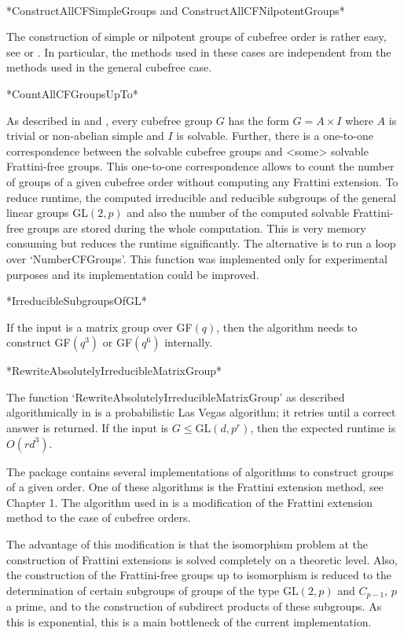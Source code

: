 ~

*ConstructAllCFSimpleGroups and ConstructAllCFNilpotentGroups*

The construction of simple or nilpotent groups of cubefree
order is rather easy, see \cite{Di05} or \cite{DiEi05}. In particular, the
methods used in these cases are independent from the methods used in the general cubefree case.


*CountAllCFGroupsUpTo*

As described in \cite{Di05} and \cite{DiEi05}, every cubefree group $G$ has
the form $G=A\times I$ where $A$ is trivial or non-abelian simple and $I$ is
solvable. Further, there is a one-to-one correspondence between the solvable
cubefree groups and <some> solvable Frattini-free groups. This one-to-one
correspondence allows to count the number of groups of a given cubefree order without
computing any Frattini extension.
To reduce runtime, the
computed irreducible and reducible subgroups of the general linear groups
GL$(2,p)$ and also the number of the computed solvable
Frattini-free groups are stored during the whole computation. This is very
memory consuming but reduces the runtime significantly. The alternative is to
run a loop over `NumberCFGroups'.
This function was implemented only for experimental purposes and its
implementation could be improved.

*IrreducibleSubgroupsOfGL*

If the input is a matrix group over GF$(q)$, then the algorithm needs to
construct GF$(q^3)$ or GF$(q^6)$ internally. 



*RewriteAbsolutelyIrreducibleMatrixGroup*

The function `RewriteAbsolutelyIrreducibleMatrixGroup' as described
algorithmically in
\cite{GlHo97} is a probabilistic Las Vegas algorithm; it retries until a correct
answer is returned. If the input is $G\leq$GL$(d,p^r)$, then the
expected runtime is $O(rd^3)$.



The package {\GrpConst} contains several implementations of algorithms to
construct groups of a given order. One of these algorithms is the Frattini
extension method, see Chapter 1. The algorithm used in
{\Cubefree} is a modification of the Frattini extension method to the case of
cubefree orders. 

The advantage of this modification is that the isomorphism
problem at the construction of Frattini extensions is solved completely on a
theoretic level. Also, the construction of the Frattini-free groups up to
isomorphism is reduced to the determination of certain subgroups of groups of
the type GL$(2,p)$ and $C_{p-1}$, $p$ a prime, and to the construction of subdirect products
of these subgroups. As this is exponential, this is a main bottleneck of the current implementation.


